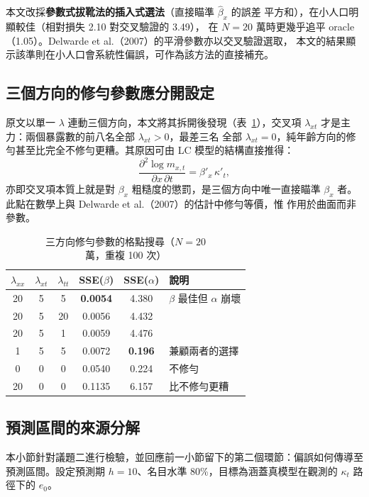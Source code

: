 \documentclass[UTF8, fontset=macnew, a4paper, 12pt]{ctexart}
\begin{document}
本文改採\textbf{參數式拔靴法的插入式選法}（直接瞄準 $\hat\beta_x$ 的誤差
平方和），在小人口明顯較佳（相對損失 2.10 對交叉驗證的 3.49），
在 $N=20$ 萬時更幾乎追平 oracle（1.05）。Delwarde et al.（2007）的平滑參數亦以交叉驗證選取，
本文的結果顯示該準則在小人口會系統性偏誤，可作為該方法的直接補充。

\subsection{三個方向的修勻參數應分開設定}

原文以單一 $\lambda$ 連動三個方向，本文將其拆開後發現（表~\ref{tab:lam3}），交叉項
$\lambda_{xt}$ 才是主力：兩個暴露數的前八名全部 $\lambda_{xt}>0$，最差三名
全部 $\lambda_{xt}=0$，純年齡方向的修勻甚至比完全不修勻更糟。其原因可由
LC 模型的結構直接推得：
\begin{equation}
\frac{\partial^2\log m_{x,t}}{\partial x\,\partial t}=\beta'_x\,\kappa'_t,
\end{equation}
亦即交叉項本質上就是對 $\beta_x$ 粗糙度的懲罰，是三個方向中唯一直接瞄準
$\beta_x$ 者。此點在數學上與 Delwarde et al.（2007）的估計中修勻等價，惟
作用於曲面而非參數。

\begin{table}[H]
\centering
\caption{三方向修勻參數的格點搜尋（$N=20$ 萬，重複 100 次）}
\small
\begin{tabular}{ccccc l}
\toprule
$\lambda_{xx}$ & $\lambda_{xt}$ & $\lambda_{tt}$ & SSE($\beta$) & SSE($\alpha$) & 說明\\
\midrule
20 & 5 & 5  & \textbf{0.0054} & 4.380 & $\beta$ 最佳但 $\alpha$ 崩壞\\
20 & 5 & 20 & 0.0056 & 4.432 & \\
20 & 5 & 1  & 0.0059 & 4.476 & \\
1  & 5 & 5  & 0.0072 & \textbf{0.196} & 兼顧兩者的選擇\\
0  & 0 & 0  & 0.0540 & 0.224 & 不修勻\\
20 & 0 & 0  & 0.1135 & 6.157 & 比不修勻更糟\\
\bottomrule
\end{tabular}
\label{tab:lam3}
\end{table}

\subsection{預測區間的來源分解}

本小節針對議題二進行檢驗，並回應前一小節留下的第二個環節：偏誤如何傳導至
預測區間。設定預測期 $h=10$、名目水準 80\%，目標為涵蓋真模型在觀測的
$\kappa_t$ 路徑下的 $e_0$。
\end{document}
